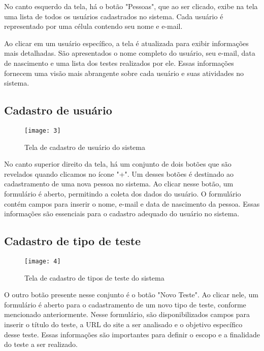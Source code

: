 No canto esquerdo da tela, há o botão "Pessoas", que ao ser clicado, exibe na tela uma lista de todos os usuários cadastrados no sistema. Cada usuário é representado por uma célula contendo seu nome e e-mail.

Ao clicar em um usuário específico, a tela é atualizada para exibir informações mais detalhadas. São apresentados o nome completo do usuário, seu e-mail, data de nascimento e uma lista dos testes realizados por ele. Essas informações fornecem uma visão mais abrangente sobre cada usuário e suas atividades no sistema.

\clearpage
\subsection{Cadastro de usuário}

\begin{figure}[h]
  \caption{Tela de cadastro de usuário do sistema}
  \centering
  \texttt{[image: 3]}
  \label{fig:3}
\end{figure}
\FloatBarrier

No canto superior direito da tela, há um conjunto de dois botões que são revelados quando clicamos no ícone "+". Um desses botões é destinado ao cadastramento de uma nova pessoa no sistema. Ao clicar nesse botão, um formulário é aberto, permitindo a coleta dos dados do usuário. O formulário contém campos para inserir o nome, e-mail e data de nascimento da pessoa. Essas informações são essenciais para o cadastro adequado do usuário no sistema.

\clearpage
\subsection{Cadastro de tipo de teste}

\begin{figure}[h]
  \caption{Tela de cadastro de tipos de teste do sistema}
  \centering
  \texttt{[image: 4]}
  \label{fig:4}
\end{figure}
\FloatBarrier

O outro botão presente nesse conjunto é o botão "Novo Teste". Ao clicar nele, um formulário é aberto para o cadastramento de um novo tipo de teste, conforme mencionado anteriormente. Nesse formulário, são disponibilizados campos para inserir o título do teste, a URL do site a ser analisado e o objetivo específico desse teste. Essas informações são importantes para definir o escopo e a finalidade do teste a ser realizado.

